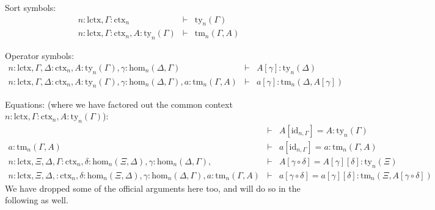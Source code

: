 \documentclass[11pt,a4paper]{article}
\theoremstyle{definition}
\newcommand{\id}{\mathsf{id}}
\def\Hom{\mathrm{hom}}
\def\id{\mathrm{id}}
\def\lctx{\mathrm{lctx}}
\newcommand{\ctx}{\mathrm{ctx}}
\newcommand{\ty}{\mathrm{ty}}
\newcommand{\tm}{\mathrm{tm}}
\begin{document}
Sort symbols:
\begin{eqnarray*}
n : \lctx, \Gamma : \ctx_n &\vdash& \ty_n(\Gamma)\\
n : \lctx, \Gamma : \ctx_n, A:\ty_n(\Gamma) &\vdash& \tm_n(\Gamma,A)
\end{eqnarray*}

Operator symbols:
\begin{eqnarray*}
n : \lctx, \Gamma,\Delta : \ctx_n, A:\ty_n(\Gamma), \gamma : \Hom_n(\Delta,\Gamma) &\vdash&
A[\gamma] : \ty_n(\Delta)\\
n : \lctx, \Gamma,\Delta : \ctx_n, A:\ty_n(\Gamma), \gamma : \Hom_n(\Delta,\Gamma), a:\tm_n(\Gamma,A) &\vdash&  a[\gamma] : \tm_n(\Delta,A[\gamma])
\end{eqnarray*}

Equations: (where we have factored out the common context $n : \lctx, \Gamma : \ctx_n, A:\ty_n(\Gamma)$):
\begin{eqnarray*}
&\vdash& A[\id_{n,\Gamma}] = A : \ty_n(\Gamma)\\
a:\tm_n(\Gamma,A) &\vdash& a[\id_{n,\Gamma}] = a : \tm_n(\Gamma,A)\\
n : \lctx, \Xi,\Delta,\Gamma : \ctx_n, \delta : \Hom_n(\Xi,\Delta), \gamma : \Hom_n(\Delta,\Gamma),
&\vdash& A[\gamma\circ\delta] = A[\gamma][\delta]: \ty_n(\Xi)\\
n : \lctx, \Xi,\Delta, : \ctx_n, \delta : \Hom_n(\Xi,\Delta), \gamma : \Hom_n(\Delta,\Gamma),
a:\tm_n(\Gamma,A) &\vdash&
a[\gamma\circ\delta] = a[\gamma][\delta]: \tm_n(\Xi,A[\gamma\circ\delta])
\end{eqnarray*}
We have dropped some of the official arguments here too, and will do so in the following as well.
  
\end{document}
